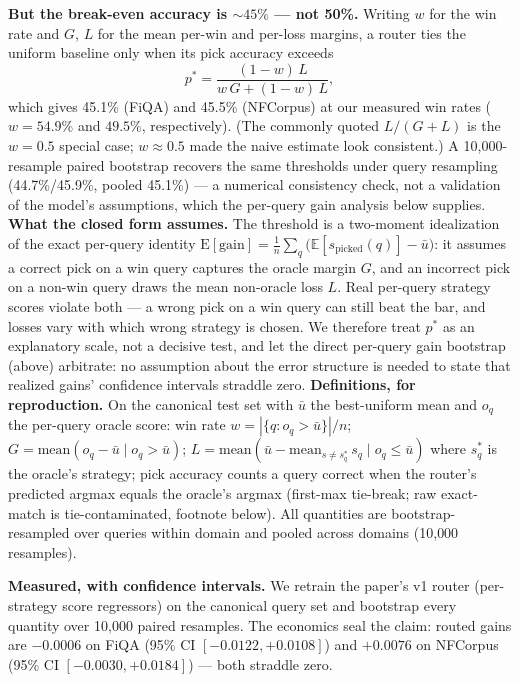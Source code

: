 \documentclass[11pt]{article}
\begin{document}
\textbf{But the break-even accuracy is ${\sim}45\%$ --- not 50\%.} Writing $w$ for the win rate and $G$, $L$ for the mean per-win and per-loss margins, a router ties the uniform baseline only when its pick accuracy exceeds
\[
p^* = \frac{(1-w)\,L}{w\,G + (1-w)\,L},
\]
which gives 45.1\% (FiQA) and 45.5\% (NFCorpus) at our measured win rates ($w = 54.9\%$ and $49.5\%$, respectively). (The commonly quoted $L/(G+L)$ is the $w = 0.5$ special case; $w \approx 0.5$ made the naive estimate look consistent.) A 10{,}000-resample paired bootstrap recovers the same thresholds under query resampling (44.7\%/45.9\%, pooled 45.1\%) --- a numerical consistency check, not a validation of the model's assumptions, which the per-query gain analysis below supplies.
\textbf{What the closed form assumes.} The threshold is a two-moment idealization of the exact per-query identity $\mathrm{E}[\mathrm{gain}] = \frac{1}{n}\sum_q \big(\mathbb{E}[s_{\mathrm{picked}}(q)] - \bar{u}\big)$: it assumes a correct pick on a win query captures the oracle margin $G$, and an incorrect pick on a non-win query draws the mean non-oracle loss $L$. Real per-query strategy scores violate both --- a wrong pick on a win query can still beat the bar, and losses vary with which wrong strategy is chosen. We therefore treat $p^*$ as an explanatory scale, not a decisive test, and let the direct per-query gain bootstrap (above) arbitrate: no assumption about the error structure is needed to state that realized gains' confidence intervals straddle zero.
\textbf{Definitions, for reproduction.} On the canonical test set with $\bar{u}$ the best-uniform mean and $o_q$ the per-query oracle score: win rate $w = |\{q : o_q > \bar{u}\}|/n$; $G = \mathrm{mean}(o_q - \bar{u} \mid o_q > \bar{u})$; $L = \mathrm{mean}(\bar{u} - \mathrm{mean}_{s \neq s^*_q}\, s_q \mid o_q \leq \bar{u})$ where $s^*_q$ is the oracle's strategy; pick accuracy counts a query correct when the router's predicted argmax equals the oracle's argmax (first-max tie-break; raw exact-match is tie-contaminated, footnote below). All quantities are bootstrap-resampled over queries within domain and pooled across domains (10{,}000 resamples).

\textbf{Measured, with confidence intervals.} We retrain the paper's v1 router (per-strategy score regressors) on the canonical query set and bootstrap every quantity over 10{,}000 paired resamples. The economics seal the claim: routed gains are $-0.0006$ on FiQA (95\% CI $[-0.0122, +0.0108]$) and $+0.0076$ on NFCorpus (95\% CI $[-0.0030, +0.0184]$) --- both straddle zero.
\end{document}

